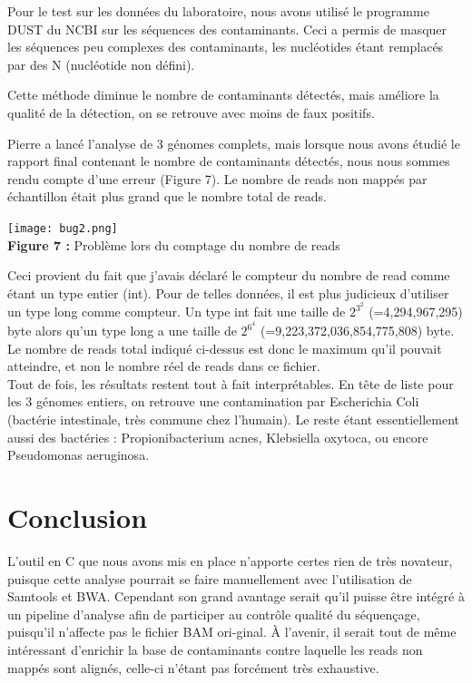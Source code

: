 \documentclass[a4paper,12pt]{article}
\begin{document}
Pour le test sur les données du laboratoire, nous avons utilisé le programme DUST du NCBI sur les séquences des contaminants. Ceci a permis de masquer les séquences peu complexes des contaminants, les nucléotides étant remplacés par des N (nucléotide non défini).

Cette méthode diminue le nombre de contaminants détectés, mais améliore la qualité de la détection, on se retrouve avec moins de faux positifs. 

Pierre a lancé l'analyse de 3 génomes complets, mais lorsque nous avons étudié le rapport final contenant le nombre de contaminants détectés, nous nous sommes rendu compte d'une erreur (Figure 7). Le nombre de reads non mappés par échantillon était plus grand que le nombre total de reads. 
\begin{center}
 \texttt{[image: bug2.png]}~\\
 \textbf{Figure 7 :} Problème lors du comptage du nombre de reads
 \end{center}
Ceci provient du fait que j'avais déclaré le compteur du nombre de read comme étant un type entier (int). Pour de telles données, il est plus judicieux d'utiliser un type long comme compteur. Un type int fait une taille de $2^3^2$ (=4,294,967,295) byte alors qu'un type long a une taille de $2^6^4$ (=9,223,372,036,854,775,808) byte. Le nombre de reads total indiqué ci-dessus est donc le maximum qu'il pouvait atteindre, et non le nombre réel de reads dans ce fichier. \\

Tout de fois, les résultats restent tout à fait interprétables. En tête de liste pour les 3 génomes entiers, on retrouve une contamination par Escherichia Coli (bactérie intestinale, très commune chez l'humain). Le reste étant essentiellement aussi des bactéries : Propionibacterium acnes, Klebsiella oxytoca, ou encore Pseudomonas aeruginosa. 

\clearpage
\section{Conclusion}
L'outil en C que nous avons mis en place n'apporte  certes rien de très novateur, puisque cette analyse pourrait se faire manuellement avec l'utilisation de Samtools et BWA. Cependant son grand avantage serait qu'il puisse être intégré à un pipeline d'analyse afin de participer au contrôle qualité du séquençage, puisqu'il n'affecte pas le fichier BAM ori-ginal. À l'avenir, il serait tout de même intéressant d'enrichir la base de contaminants contre laquelle les reads non mappés sont alignés, celle-ci n'étant pas forcément très exhaustive.\\
\end{document}
